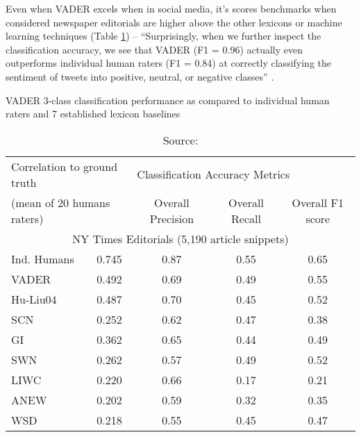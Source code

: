 Even when VADER excels when in social media, it's scores benchmarks when considered newspaper editorials are higher above the other lexicons or machine learning techniques (Table \ref{tab:vaderscore}) -- ``Surprisingly, when we further inspect the classification accuracy, we see that VADER (F1 = 0.96) actually even outperforms individual human raters (F1 = 0.84) at correctly classifying the sentiment of tweets into positive, neutral, or negative classes'' \citep[p.216]{hutto2014vader}.

\begin{table}[!h]
\centering
\caption{VADER 3-class classification performance as compared to individual human raters and 7 established lexicon baselines}
\begin{tabular}{l|c|c|c|c}
\hline
\multicolumn{2}{l|}{Correlation to ground truth} & \multicolumn{3}{l}{Classification Accuracy Metrics}   \\ \cline{3-5} 
\multicolumn{2}{l|}{(mean of 20 humans raters)}  & Overall Precision & Overall Recall & Overall F1 score \\ \hline
\multicolumn{5}{c}{NY Times Editorials (5,190 article snippets)}                                         \\ \hline
Ind. Humans                & 0.745               & 0.87              & 0.55           & 0.65             \\
VADER                      & 0.492               & 0.69              & 0.49           & 0.55             \\
Hu-Liu04                   & 0.487               & 0.70              & 0.45           & 0.52             \\
SCN                        & 0.252               & 0.62              & 0.47           & 0.38             \\
GI                         & 0.362               & 0.65              & 0.44           & 0.49             \\
SWN                        & 0.262               & 0.57              & 0.49           & 0.52             \\
LIWC                       & 0.220               & 0.66              & 0.17           & 0.21             \\
ANEW                       & 0.202               & 0.59              & 0.32           & 0.35             \\
WSD                        & 0.218               & 0.55              & 0.45           & 0.47             \\ \hline 
\end{tabular}
\caption*{Source: \citep[p. 223]{hutto2014vader}}
\label{tab:vaderscore}
\end{table}



